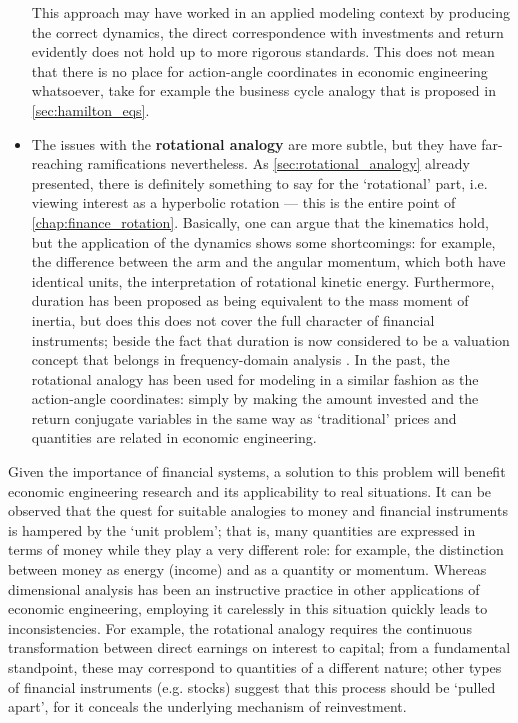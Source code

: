 \begin{itemize}
    This approach may have worked in an applied modeling context by producing the correct dynamics, the direct correspondence with investments and return evidently does not hold up to more rigorous standards. This does not mean that there is no place for action-angle coordinates in economic engineering whatsoever, take for example the business cycle analogy that is proposed in \cref{sec:hamilton_eqs}.
    \item The issues with the \textbf{rotational analogy} are more subtle, but they have far-reaching ramifications nevertheless. As \cref{sec:rotational_analogy} already presented, there is definitely something to say for the `rotational' part, i.e. viewing interest as a hyperbolic rotation --- this is the entire point of \cref{chap:finance_rotation}. Basically, one can argue that the kinematics hold, but the application of the dynamics shows some shortcomings: for example, the difference between the arm and the angular momentum, which both have identical units, the interpretation of rotational kinetic energy. Furthermore, duration has been proposed as being equivalent to the mass moment of inertia, but does this does not cover the full character of financial instruments; beside the fact that duration is now considered to be a valuation concept that belongs in frequency-domain analysis \cite{Krabbenborg2021,Kruimer2021}. In the past, the rotational analogy has been used for modeling in a similar fashion as the action-angle coordinates: simply by making the amount invested and the return conjugate variables in the same way as `traditional' prices and quantities are related in economic engineering.
\end{itemize}
Given the importance of financial systems, a solution to this problem will benefit economic engineering research and its applicability to real situations. It can be observed that the quest for suitable analogies to money and financial instruments is hampered by the `unit problem'; that is, many quantities are expressed in terms of money while they play a very different role: for example, the distinction between money as energy (income) and as a quantity or momentum. Whereas dimensional analysis has been an instructive practice in other applications of economic engineering, employing it carelessly in this situation quickly leads to inconsistencies. For example, the rotational analogy requires the continuous transformation between direct earnings on interest to capital; from a fundamental standpoint, these may correspond to quantities of a different nature; other types of financial instruments (e.g. stocks) suggest that this process should be `pulled apart', for it conceals the underlying mechanism of reinvestment.

